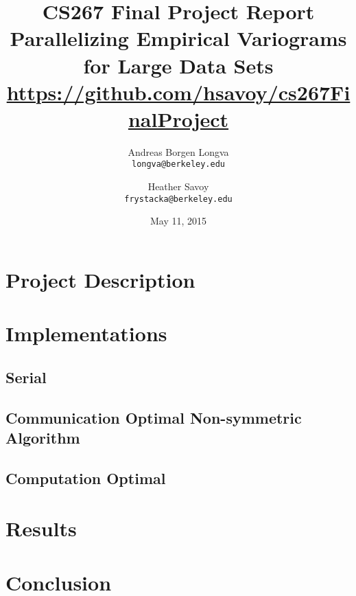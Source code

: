 \documentclass[11pt, oneside,titlepage]{article}   	%
\title{CS267 Final Project Report\\
  \large Parallelizing Empirical Variograms for Large Data Sets\\
  \url{https://github.com/hsavoy/cs267FinalProject}}
\author{Andreas Borgen Longva\\
  \texttt{longva@berkeley.edu}
  \and
  Heather Savoy\\
  \texttt{frystacka@berkeley.edu}}
\date{May 11, 2015}							%
\begin{document}
\maketitle
\section{Project Description}


\section{Implementations}
  \subsection{Serial}
    
  \subsection{Communication Optimal Non-symmetric Algorithm}
    
  \subsection{Computation Optimal}
   
   
   \FloatBarrier
\section{Results}
  

   \FloatBarrier
\section{Conclusion}
   
   
   \FloatBarrier



\end{document}
